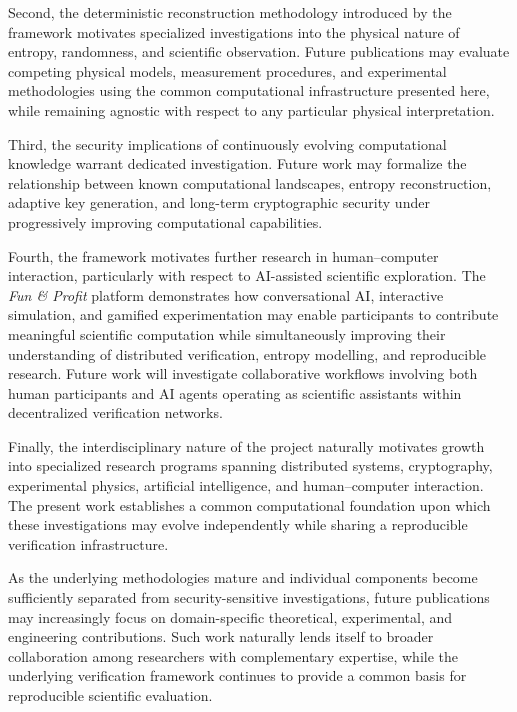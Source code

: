 \documentclass[11pt]{article}
\begin{document}
Second,
the deterministic reconstruction methodology introduced by the
framework motivates specialized investigations into the physical nature
of entropy,
randomness,
and scientific observation.
Future publications may evaluate competing physical models,
measurement procedures,
and experimental methodologies using the common computational
infrastructure presented here,
while remaining agnostic with respect to any particular physical
interpretation.

Third,
the security implications of continuously evolving computational
knowledge warrant dedicated investigation.
Future work may formalize the relationship between known computational
landscapes,
entropy reconstruction,
adaptive key generation,
and long-term cryptographic security under progressively improving
computational capabilities.

Fourth,
the framework motivates further research in human--computer
interaction,
particularly with respect to AI-assisted scientific exploration.
The \emph{Fun \& Profit} platform demonstrates how conversational AI,
interactive simulation,
and gamified experimentation may enable participants to contribute
meaningful scientific computation while simultaneously improving their
understanding of distributed verification,
entropy modelling,
and reproducible research.
Future work will investigate collaborative workflows involving both
human participants and AI agents operating as scientific assistants
within decentralized verification networks.

Finally, the interdisciplinary nature of the project naturally
motivates growth into specialized research programs spanning
distributed systems, cryptography, experimental physics,
artificial intelligence, and human--computer interaction.
The present work establishes a common computational foundation upon
which these investigations may evolve independently while sharing a
reproducible verification infrastructure.

As the underlying methodologies mature and individual components become
sufficiently separated from security-sensitive investigations, future
publications may increasingly focus on domain-specific theoretical,
experimental, and engineering contributions. Such work naturally lends
itself to broader collaboration among researchers with complementary
expertise, while the underlying verification framework continues to
provide a common basis for reproducible scientific evaluation.

\end{document}
